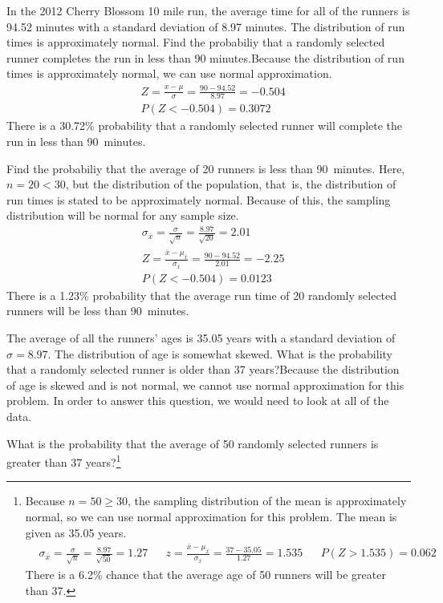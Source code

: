 \textA{\pagebreak}

\begin{example}{
In the 2012 Cherry Blossom 10 mile run, the average time for all of the runners is 94.52 minutes with a standard deviation of 8.97 minutes. The distribution of run times is approximately normal. Find the probabiliy that a randomly selected runner completes the run in less than 90 minutes.}Because the distribution of run times is approximately normal, we can use normal approximation.
\begin{align*}
&Z = \frac{x - \mu}{\sigma}=\frac{90-94.52}{8.97}=-0.504 \\
&P(Z < -0.504) = 0.3072
\end{align*}
There is a 30.72\% probability that a randomly selected runner will complete the run in less than 90~minutes.
\end{example}

\begin{example}{
Find the probabiliy that the average of 20 runners is less than 90~minutes.}
Here, $n=20<30$, but the distribution of the population, that~is, the distribution of run times is stated to be approximately normal. Because of this, the sampling distribution will be normal for any sample size.
\begin{align*}
&\sigma_{\bar{x}}=\frac{\sigma}{\sqrt{n}}=\frac{8.97}{\sqrt{20}}=2.01 \\
&Z = \frac{\bar{x} - \mu_{\bar{x}}}{\sigma_{\bar{x}}}=\frac{90-94.52}{2.01}=-2.25\\
&P(Z < -0.504) = 0.0123
\end{align*}
There is a 1.23\% probability that the average run time of 20 randomly selected runners will be less than 90~minutes.
\end{example}

\begin{example}{
The average of all the runners' ages is 35.05 years with a standard deviation of $\sigma = 8.97$. The distribution of age is somewhat skewed. What is the probability that a randomly selected runner is older than 37 years?}Because the distribution of age is skewed and is not normal, we cannot use normal approximation for this problem. In order to answer this question, we would need to look at all of the data.
\end{example}

\begin{exercise}
What is the probability that the average of 50 randomly selected runners is greater than 37 years?\footnote{Because $n=50\ge 30$, the sampling distribution of the mean is approximately normal, so we can use normal approximation for this problem. The mean is given as 35.05 years.
\begin{align*}
&\sigma_{\bar{x}}
	= \frac{\sigma}{\sqrt{n}}
	= \frac{8.97}{\sqrt{50}}=1.27
&&z=\frac{\bar{x}-\mu_{\bar{x}}}{\sigma_{\bar{x}}} = \frac{37-35.05}{1.27}=1.535
&&P(Z > 1.535) = 0.062
\end{align*}
There is a 6.2\% chance that the average age of 50 runners will be greater than 37.} 
\end{exercise}

